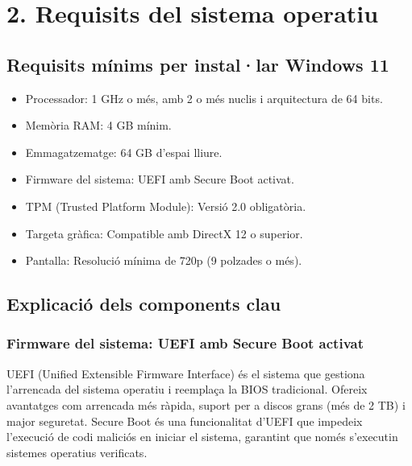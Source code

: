 \documentclass[
  12 pt,
  a4paper,
]{article}
\providecommand{\tightlist}{%
  \setlength{\itemsep}{0pt}\setlength{\parskip}{0pt}}
\begin{document}
\section{2. Requisits del sistema
operatiu}\label{requisits-del-sistema-operatiu}

\subsection{Requisits mínims per instal·lar Windows
11}\label{requisits-muxednims-per-installar-windows-11}

\begin{itemize}
\tightlist
\item
  Processador: 1 GHz o més, amb 2 o més nuclis i arquitectura de 64
  bits.\\
\item
  Memòria RAM: 4 GB mínim.\\
\item
  Emmagatzematge: 64 GB d'espai lliure.\\
\item
  Firmware del sistema: UEFI amb Secure Boot activat.\\
\item
  TPM (Trusted Platform Module): Versió 2.0 obligatòria.\\
\item
  Targeta gràfica: Compatible amb DirectX 12 o superior.\\
\item
  Pantalla: Resolució mínima de 720p (9 polzades o més).
\end{itemize}

\subsection{Explicació dels components
clau}\label{explicaciuxf3-dels-components-clau}

\subsubsection{Firmware del sistema: UEFI amb Secure Boot
activat}\label{firmware-del-sistema-uefi-amb-secure-boot-activat}

UEFI (Unified Extensible Firmware Interface) és el sistema que gestiona
l'arrencada del sistema operatiu i reemplaça la BIOS tradicional.
Ofereix avantatges com arrencada més ràpida, suport per a discos grans
(més de 2 TB) i major seguretat. Secure Boot és una funcionalitat d'UEFI
que impedeix l'execució de codi maliciós en iniciar el sistema,
garantint que només s'executin sistemes operatius verificats.
\end{document}
